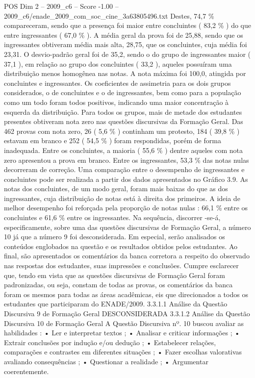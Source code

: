 \begin{textsample}{POS Dim 2 – 2009\_c6 – Score -1.00 – 2009\_c6/enade\_2009\_com\_soc\_cine\_3a63805496.txt}
Destes, 74,7 \% compareceram, sendo que a presença foi maior entre concluintes ( 83,2 \% ) do que entre ingressantes ( 67,0 \% ).
A média geral da prova foi de 25,88, sendo que os ingressantes obtiveram média mais alta, 28,75, que os concluintes, cuja média foi 23,31.
O desvio-padrão geral foi de 35,2, sendo o do grupo de ingressantes maior ( 37,1 ), em relação ao grupo dos concluintes ( 33,2 ), aqueles possuíram uma distribuição menos homogênea nas notas.
A nota máxima foi 100,0, atingida por concluintes e ingressantes.
Os coeficientes de assimetria para os dois grupos considerados, o de concluintes e o de ingressantes, bem como para a população como um todo foram todos positivos, indicando uma maior concentração à esquerda da distribuição.
Para todos os grupos, mais de metade dos estudantes presentes obtiveram nota zero nas questões discursivas da Formação Geral.
Das 462 provas com nota zero, 26 ( 5,6 \% ) continham um protesto, 184 ( 39,8 \% ) estavam em branco e 252 ( 54,5 \% ) foram respondidas, porém de forma inadequada.
Entre os concluintes, a maioria ( 55,6 \% ) dentre aqueles com nota zero apresentou a prova em branco.
Entre os ingressantes, 53,3 \% das notas nulas decorreram de correção.
Uma comparação entre o desempenho de ingressantes e concluintes pode ser realizada a partir dos dados apresentados no Gráfico 3.9.
As notas dos concluintes, de um modo geral, foram mais baixas do que as dos ingressantes, cuja distribuição de notas está à direita dos primeiros.
A ideia de melhor desempenho foi reforçada pela proporção de notas nulas : 66,1 \% entre os concluintes e 61,6 \% entre os ingressantes.
Na sequência, discorrer -se-á, especificamente, sobre uma das questões discursivas de Formação Geral, a número 10 já que a número 9 foi desconsiderada.
Em especial, serão analisados os conteúdos englobados na questão e os resultados obtidos pelos estudantes.
Ao final, são apresentados os comentários da banca corretora a respeito do observado nas respostas dos estudantes, suas impressões e conclusões.
Cumpre esclarecer que, tendo em vista que as questões discursivas de Formação Geral foram padronizadas, ou seja, constam de todas as provas, os comentários da banca foram os mesmos para todas as áreas acadêmicas, eis que direcionados a todos os estudantes que participaram do ENADE/2009. 3.3.1.1 Análise da Questão Discursiva 9 de Formação Geral DESCONSIDERADA 3.3.1.2 Análise da Questão Discursiva 10 de Formação Geral A Questão Discursiva nº. 10 buscou avaliar as habilidades : • Ler e interpretar textos ; • Analisar e criticar informações ; • Extrair conclusões por indução e/ou dedução ; • Estabelecer relações, comparações e contrastes em diferentes situações ; • Fazer escolhas valorativas avaliando consequências ; • Questionar a realidade ; • Argumentar coerentemente.

\end{textsample}
